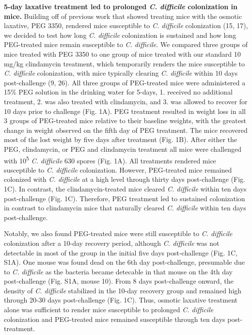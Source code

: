 \documentclass[
  11pt,
]{article}
\begin{document}
\textbf{5-day laxative treatment led to prolonged \emph{C. difficile}
colonization in mice.} Building off of previous work that showed
treating mice with the osmotic laxative, PEG 3350, rendered mice
susceptible to \emph{C. difficile} colonization (15, 17), we decided to
test how long \emph{C. difficile} colonization is sustained and how long
PEG-treated mice remain susceptible to \emph{C. difficile}. We compared
three groups of mice treated with PEG 3350 to one group of mice treated
with our standard 10 mg/kg clindamycin treatment, which temporarily
renders the mice susceptible to \emph{C. difficile} colonization, with
mice typically clearing \emph{C. difficile} within 10 days
post-challenge (9, 26). All three groups of PEG-treated mice were
administered a 15\% PEG solution in the drinking water for 5-days, 1.
received no additional treatment, 2. was also treated with clindamycin,
and 3. was allowed to recover for 10 days prior to challenge (Fig. 1A).
PEG treatment resulted in weight loss in all 3 groups of PEG-treated
mice relative to their baseline weights, with the greatest change in
weight observed on the fifth day of PEG treatment. The mice recovered
most of the lost weight by five days after treatment (Fig. 1B). After
either the PEG, clindamycin, or PEG and clindamycin treatment all mice
were challenged with 10\textsuperscript{5} \emph{C. difficile} 630
spores (Fig. 1A). All treatments rendered mice susceptible to \emph{C.
difficile} colonization. However, PEG-treated mice remained colonized
with \emph{C. difficile} at a high level through thirty days
post-challenge (Fig. 1C). In contrast, the clindamycin-treated mice
cleared \emph{C. difficile} within ten days post-challenge (Fig. 1C).
Therefore, PEG treatment led to sustained colonization in contrast to
clindamycin mice that naturally cleared \emph{C. difficile} within ten
days post-challenge.

Notably, we also found PEG-treated mice were still susceptible to
\emph{C. difficile} colonization after a 10-day recovery period,
although \emph{C. difficile} was not detectable in most of the group in
the initial five days post-challenge (Fig. 1C, S1A). One mouse was found
dead on the 6th day post-challenge, presumable due to \emph{C.
difficile} as the bacteria became detecable in that mouse on the 4th day
post-challenge (Fig. S1A, mouse 10). From 8 days post-challenge onward,
the density of \emph{C. difficile} stabilized in the 10-day recovery
group and remained high through 20-30 days post-challenge (Fig. 1C).
Thus, osmotic laxative treatment alone was sufficient to render mice
susceptible to prolonged \emph{C. difficile} colonization and
PEG-treated mice remained susceptible through ten days post-treatment.
\end{document}
